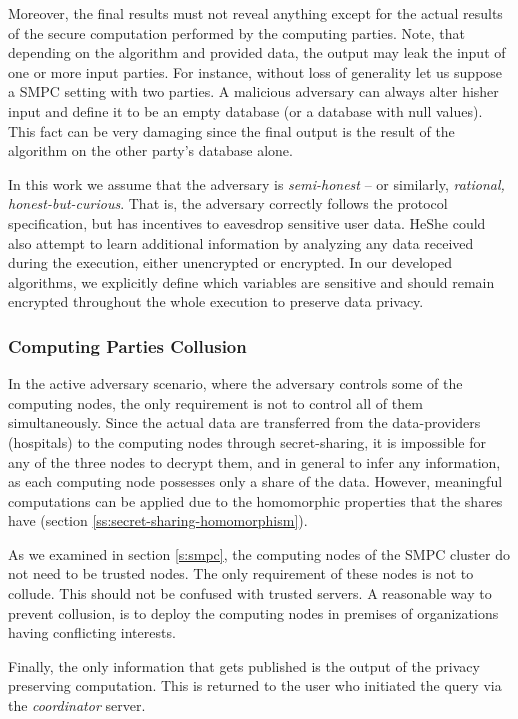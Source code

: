 Moreover, the final results must not reveal anything except for the actual results of the secure computation performed by the computing parties.
Note, that depending on the algorithm and provided data, the output may leak the input of one or more input parties.
For instance, without loss of generality let us suppose a SMPC setting with two parties.
A malicious adversary can always alter his\myslash her input and define it to be an empty database (or a database with null values).
This fact can be very damaging since the final output is the result of the algorithm on the other party’s database alone.

In this work we assume that the adversary is \emph{semi\hyp honest} -- or similarly, \emph{rational, honest\hyp but\hyp curious}.
That is, the adversary correctly follows the protocol specification, but has incentives to eavesdrop sensitive user data.
He\myslash She could also attempt to learn additional information by analyzing any data received during the execution, either unencrypted or encrypted.
In our developed algorithms, we explicitly define which variables are sensitive and should remain encrypted throughout the whole execution to preserve data privacy.


\subsubsection{Computing Parties Collusion}\label{s:computing-parties-collusion}
In the active adversary scenario, where the adversary controls some of the computing nodes, the only requirement is not to control all of them simultaneously.
Since the actual data are transferred from the data-providers (hospitals) to the computing nodes through secret\hyp sharing, it is impossible for any of the three nodes to decrypt them, and in general to infer any information, as each computing node possesses only a share of the data.
However, meaningful computations can be applied due to the homomorphic properties that the shares have (section \ref{ss:secret-sharing-homomorphism}).

As we examined in section \ref{s:smpc}, the computing nodes of the SMPC cluster do not need to be trusted nodes.
The only requirement of these nodes is not to collude.
This should not be confused with trusted servers.
A reasonable way to prevent collusion, is to deploy the computing nodes in premises of organizations having conflicting interests.

Finally, the only information that gets published is the output of the privacy preserving computation.
This is returned to the user who initiated the query via the \textit{coordinator} server.



